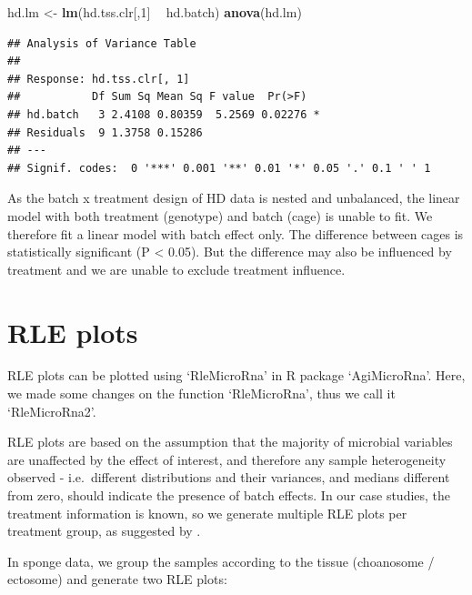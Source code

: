 \documentclass[]{book}
\newenvironment{Shaded}{\begin{snugshade}}{\end{snugshade}}
\newcommand{\KeywordTok}[1]{\textcolor[rgb]{0.13,0.29,0.53}{\textbf{#1}}}
\newcommand{\DecValTok}[1]{\textcolor[rgb]{0.00,0.00,0.81}{#1}}
\newcommand{\StringTok}[1]{\textcolor[rgb]{0.31,0.60,0.02}{#1}}
\newcommand{\OperatorTok}[1]{\textcolor[rgb]{0.81,0.36,0.00}{\textbf{#1}}}
\newcommand{\NormalTok}[1]{#1}
\begin{document}
\begin{Shaded}
\begin{Highlighting}[]
\NormalTok{hd.lm <-}\StringTok{ }\KeywordTok{lm}\NormalTok{(hd.tss.clr[,}\DecValTok{1}\NormalTok{] }\OperatorTok{~}\StringTok{ }\NormalTok{hd.batch)}
\KeywordTok{anova}\NormalTok{(hd.lm)}
\end{Highlighting}
\end{Shaded}

\begin{verbatim}
## Analysis of Variance Table
## 
## Response: hd.tss.clr[, 1]
##           Df Sum Sq Mean Sq F value  Pr(>F)  
## hd.batch   3 2.4108 0.80359  5.2569 0.02276 *
## Residuals  9 1.3758 0.15286                  
## ---
## Signif. codes:  0 '***' 0.001 '**' 0.01 '*' 0.05 '.' 0.1 ' ' 1
\end{verbatim}

As the batch x treatment design of HD data is nested and unbalanced, the
linear model with both treatment (genotype) and batch (cage) is unable
to fit. We therefore fit a linear model with batch effect only. The
difference between cages is statistically significant (P \textless{}
0.05). But the difference may also be influenced by treatment and we are
unable to exclude treatment influence.

\section{RLE plots}\label{rle-plots}

RLE plots can be plotted using `RleMicroRna' in R package `AgiMicroRna'.
Here, we made some changes on the function `RleMicroRna', thus we call
it `RleMicroRna2'.

RLE plots are based on the assumption that the majority of microbial
variables are unaffected by the effect of interest, and therefore any
sample heterogeneity observed - i.e.~different distributions and their
variances, and medians different from zero, should indicate the presence
of batch effects. In our case studies, the treatment information is
known, so we generate multiple RLE plots per treatment group, as
suggested by \citep{lin2018scmerge}.

In sponge data, we group the samples according to the tissue (choanosome
/ ectosome) and generate two RLE plots:
\end{document}
